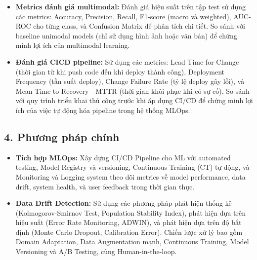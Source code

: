  \begin{itemize}
    
    \item \textbf{Metrics đánh giá multimodal:} Đánh giá hiệu suất trên tập test sử dụng các metrics: Accuracy, Precision, Recall, F1-score (macro và weighted), AUC-ROC cho từng class, và Confusion Matrix để phân tích chi tiết. So sánh với baseline unimodal models (chỉ sử dụng hình ảnh hoặc văn bản) để chứng minh lợi ích của multimodal learning.

     \item \textbf{Đánh giá CICD pipeline:} Sử dụng các metrics: Lead Time for Change (thời gian từ khi push code đến khi deploy thành công), Deployment Frequency (tần suất deploy), Change Failure Rate (tỷ lệ deploy gây lỗi), và Mean Time to Recovery - MTTR (thời gian khôi phục khi có sự cố). So sánh với quy trình triển khai thủ công trước khi áp dụng CI/CD để chứng minh lợi ích của việc tự động hóa pipeline trong hệ thống MLOps.

\end{itemize}



\subsection{4. Phương pháp chính} 
\begin{itemize}
    
    \item \textbf{Tích hợp MLOps:}
    Xây dựng CI/CD Pipeline cho ML với automated testing, Model Registry và versioning, Continuous Training (CT) tự động, và Monitoring và Logging system theo dõi metrics về model performance, data drift, system health, và user feedback trong thời gian thực. \cite{google_mlops_2021}

    \item \textbf{Data Drift Detection: }
    Sử dụng các phương pháp phát hiện thống kê (Kolmogorov-Smirnov Test, Population Stability Index), phát hiện dựa trên hiệu suất (Error Rate Monitoring, ADWIN), và phát hiện dựa trên độ bất định (Monte Carlo Dropout, Calibration Error). Chiến lược xử lý bao gồm Domain Adaptation, Data Augmentation mạnh, Continuous Training, Model Versioning và A/B Testing, cùng Human-in-the-loop. \cite{sahiner_data_drift_2023}
    

    

    

\end{itemize}
